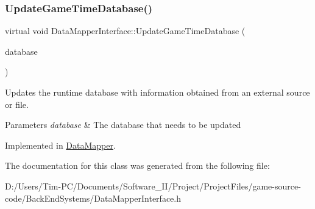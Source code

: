 \subsubsection{\texorpdfstring{Update\+Game\+Time\+Database()}{UpdateGameTimeDatabase()}}
{\footnotesize\ttfamily virtual void Data\+Mapper\+Interface\+::\+Update\+Game\+Time\+Database (\begin{DoxyParamCaption}\item[{std\+::shared\+\_\+ptr$<$ \hyperlink{class_database_interface}{Database\+Interface} $>$}]{database }\end{DoxyParamCaption})\hspace{0.3cm}{\ttfamily [pure virtual]}}



Updates the runtime database with information obtained from an external source or file. 


\begin{DoxyParams}{Parameters}
{\em database} & The database that needs to be updated \\
\hline
\end{DoxyParams}


Implemented in \hyperlink{class_data_mapper_ade3e27146120b3cb74d556e8b9e48526}{Data\+Mapper}.



The documentation for this class was generated from the following file\+:\begin{DoxyCompactItemize}
\item 
D\+:/\+Users/\+Tim-\/\+P\+C/\+Documents/\+Software\+\_\+\+I\+I/\+Project/\+Project\+Files/game-\/source-\/code/\+Back\+End\+Systems/Data\+Mapper\+Interface.\+h\end{DoxyCompactItemize}
